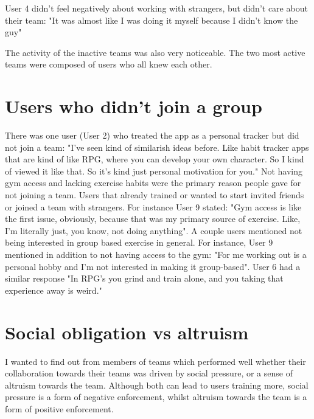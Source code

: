 \documentclass{l4proj}
\begin{document}
User 4 didn't feel negatively about working with strangers, but didn't care about their team: "It was almost like I was doing it myself because I didn't know the guy" 

The activity of the inactive teams was also very noticeable. The two most active teams were composed of users who all knew each other.


\section{Users who didn't join a group}
There was one user (User 2) who treated the app as a personal tracker but did not join a team: "I've seen kind of similarish ideas before. Like habit tracker apps that are kind of like RPG, where you can develop your own character. So I kind of viewed it like that. So it's kind just personal motivation for you." Not having gym access and lacking exercise habits were the primary reason people gave for not joining a team.  Users that already trained or wanted to start invited friends or joined a team with strangers. For instance User 9 stated: "Gym access is like the first issue, obviously, because that was my primary source of exercise. Like, I'm literally just, you know, not doing anything". A couple users mentioned not being interested in group based exercise in general. For instance, User 9 mentioned in addition to not having access to the gym: "For me working out is a personal hobby and I'm not interested in making it group-based". User 6 had a similar response "In RPG's you grind and train alone, and you taking that experience away is weird."

\section{Social obligation vs altruism}
I wanted to find out from members of teams which performed well whether their collaboration towards their teams was driven by social pressure, or a sense of altruism towards the team. Although both can lead to users training more, social pressure is a form of negative enforcement, whilst altruism towards the team is a form of positive enforcement.
\end{document}
